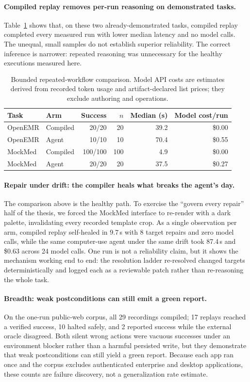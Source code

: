 \paragraph{Compiled replay removes per-run reasoning on demonstrated tasks.}
Table~\ref{tab:comparison} shows that, on these two already-demonstrated tasks,
compiled replay completed every measured run with lower median latency and no
model calls. The unequal, small samples do not establish superior reliability.
The correct inference is narrower: repeated reasoning was unnecessary for the
healthy executions measured here.

\begin{table}[t]
\centering
\caption{Bounded repeated-workflow comparison. Model API costs are estimates
derived from recorded token usage and artifact-declared list prices; they
exclude authoring and operations.}
\label{tab:comparison}
\begin{tabular}{llrrrr}
\toprule
Task & Arm & Success & $n$ & Median (s) & Model cost/run \\
\midrule
OpenEMR & Compiled & 20/20 & 20 & 39.2 & \$0.00 \\
OpenEMR & Agent & 10/10 & 10 & 70.4 & \$0.55 \\
MockMed & Compiled & 100/100 & 100 & 4.9 & \$0.00 \\
MockMed & Agent & 20/20 & 20 & 37.5 & \$0.27 \\
\bottomrule
\end{tabular}
\end{table}

\paragraph{Repair under drift: the compiler heals what breaks the agent's day.}
The comparison above is the healthy path. To exercise the ``govern every
repair'' half of the thesis, we forced the MockMed interface to re-render with a
dark palette, invalidating every recorded template crop. As a single observation
per arm, compiled replay self-healed in 9.7\,s with 8 target repairs and zero
model calls, while the same computer-use agent under the same drift took 87.4\,s
and \$0.63 across 24 model calls. One run is not a reliability claim, but it
shows the mechanism working end to end: the resolution ladder re-resolved changed
targets deterministically and logged each as a reviewable patch rather than
re-reasoning the whole task.

\paragraph{Breadth: weak postconditions can still emit a green report.}
On the one-run public-web corpus, all 29 recordings compiled; 17 replays reached
a verified success, 10 halted safely, and 2 reported success while the external
oracle disagreed. Both silent wrong actions were vacuous successes under an
environment blocker rather than a harmful persisted write, but they demonstrate
that weak postconditions can still yield a green report. Because each app ran
once and the corpus excludes authenticated enterprise and desktop applications,
these counts are failure discovery, not a generalization rate estimate.

